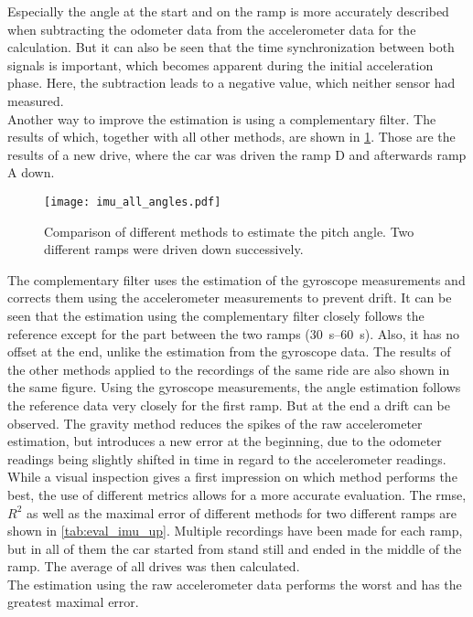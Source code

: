 Especially the angle at the start and on the ramp is more accurately described when subtracting the odometer data from the accelerometer data for the calculation.
But it can also be seen that the time synchronization between both signals is important, which becomes apparent during the initial acceleration phase.
Here, the subtraction leads to a negative value, which neither sensor had measured.\\
Another way to improve the estimation is using a complementary filter.
The results of which, together with all other methods, are shown in \cref{fig:imu_all_angles}.
Those are the results of a new drive, where the car was driven the ramp D and afterwards ramp A down.
\begin{figure}[htb]
	\centering
	\texttt{[image: imu\_all\_angles.pdf]}
	\caption[Angle estimation using the gravity method]{Comparison of different methods to estimate the pitch angle. Two different ramps were driven down successively.}
	\label{fig:imu_all_angles}
\end{figure}
The complementary filter uses the estimation of the gyroscope measurements and corrects them using the accelerometer measurements to prevent drift.
It can be seen that the estimation using the complementary filter closely follows the reference except for the part between the two ramps (\SIrange{30}{60}{\second}).
Also, it has no offset at the end, unlike the estimation from the gyroscope data.
The results of the other methods applied to the recordings of the same ride are also shown in the same figure.
Using the gyroscope measurements, the angle estimation follows the reference data very closely for the first ramp.
But at the end a drift can be observed.
The gravity method reduces the spikes of the raw accelerometer estimation, but introduces a new error at the beginning, due to the odometer readings being slightly shifted in time in regard to the accelerometer readings.\\
While a visual inspection gives a first impression on which method performs the best, the use of different metrics allows for a more accurate evaluation.
The \gls{rmse}, $R^2$ as well as the maximal error of different methods for two different ramps are shown in \cref{tab:eval_imu_up}.
Multiple recordings have been made for each ramp, but in all of them the car started from stand still and ended in the middle of the ramp.
The average of all drives was then calculated.\\
The estimation using the raw accelerometer data performs the worst and has the greatest maximal error.
